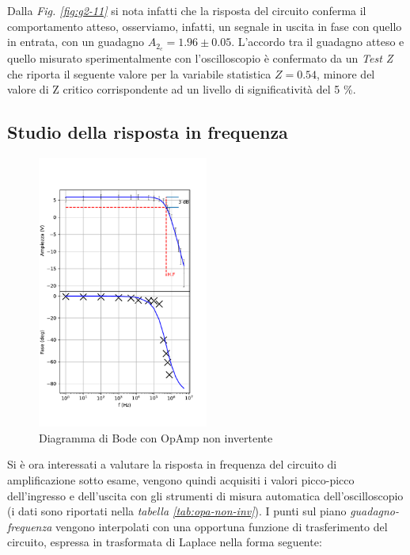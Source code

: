 \documentclass[journal]{IEEEtran}
\begin{document}
Dalla \textit{Fig. \ref{fig:g2-11}} si nota infatti che la risposta del circuito conferma il comportamento atteso, osserviamo, infatti, un segnale in uscita in fase con quello in entrata, con un guadagno $A_{2_c} = 1.96 \pm 0.05$. L'accordo tra il guadagno atteso e quello misurato sperimentalmente con l'oscilloscopio è confermato da un \textit{Test Z} che riporta il seguente valore per la variabile statistica $Z = 0.54$, minore del valore di Z critico corrispondente ad un livello di significatività del 5 \%.

\vfill

\subsection{\textbf{Studio della risposta in frequenza}}

\vspace{-20mm}

\begin{figure}[H]%
\begin {center}
\includegraphics[width=0.50\textwidth]{analysis/output/OPA-bode_gain2(mag+phase).pdf}
\caption{Diagramma di Bode con OpAmp non invertente}
\label{fig:gain2}
\end{center}
\end{figure}


Si è ora interessati a valutare la risposta in frequenza del circuito di amplificazione sotto esame, vengono quindi acquisiti i valori picco-picco dell'ingresso e dell'uscita con gli strumenti di misura automatica dell'oscilloscopio (i dati sono riportati nella \textit{tabella \ref{tab:opa-non-inv}}). I punti sul piano \textit{guadagno-frequenza} vengono interpolati con una opportuna funzione di trasferimento del circuito, espressa in trasformata di Laplace nella forma seguente:
\end{document}
